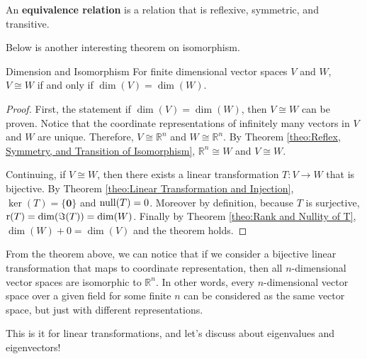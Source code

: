 \documentclass[../../../main.tex]{subfiles}
\begin{document}
\begin{definition}{}{}
An \textbf{equivalence relation} is a relation that is reflexive,
symmetric, and transitive.
\end{definition}

Below is another interesting theorem on isomorphism.

\begin{theorem}{}{Dimension and Isomorphism}
For finite dimensional vector spaces $V$ and $W$, $V \cong W$ if and
only if $\dim(V) = \dim(W)$.
\end{theorem}
\begin{proof}
First, the statement if $\dim(V) = \dim(W)$, then $V \cong W$ can be
proven. Notice that the coordinate representations of infinitely many
vectors in $V$ and $W$ are unique. Therefore, $V \cong \mathbb{R}^n$
and $W \cong \mathbb{R}^n$. By Theorem \ref{theo:Reflex, Symmetry, and
Transition of Isomorphism}, $\mathbb{R}^n \cong W$ and $V \cong W$.

Continuing, if $V \cong W$, then there exists a linear transformation
$T: V \to W$ that is bijective. By Theorem \ref{theo:Linear
Transformation and Injection}, $\ker(T) = \{ \mathbf{0} \}$ and
$\operatorname{null}(T) = 0$. Moreover by definition, because $T$ is surjective,
$\operatorname{r}(T) = \dim(\Im(T)) = \dim(W)$. Finally by Theorem \ref{theo:Rank
and Nullity of T}, $\dim(W) + 0 = \dim(V)$ and the theorem holds.
\end{proof}

From the theorem above, we can notice that if we consider a bijective
linear transformation that maps to coordinate representation, then
all $n$-dimensional vector spaces are isomorphic to $\mathbb{R}^n$.
In other words, every $n$-dimensional vector space over a given
field for some finite $n$ can be considered as the same vector space,
but just with different representations.

This is it for linear transformations, and let's discuss about
eigenvalues and eigenvectors!
\end{document}
